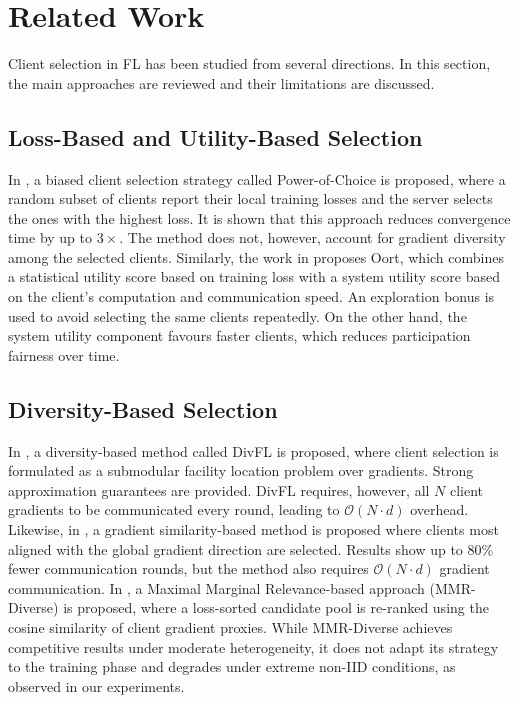 \documentclass[journal]{IEEEtran}
\begin{document}
\section{Related Work}

Client selection in FL has been studied from several directions. In this section, the main approaches are reviewed and their limitations are discussed.

\subsection{Loss-Based and Utility-Based Selection}

In \cite{cho2022towards}, a biased client selection strategy called Power-of-Choice is proposed, where a random subset of clients report their local training losses and the server selects the ones with the highest loss. It is shown that this approach reduces convergence time by up to $3\times$. The method does not, however, account for gradient diversity among the selected clients. Similarly, the work in \cite{lai2021oort} proposes Oort, which combines a statistical utility score based on training loss with a system utility score based on the client's computation and communication speed. An exploration bonus is used to avoid selecting the same clients repeatedly. On the other hand, the system utility component favours faster clients, which reduces participation fairness over time.

\subsection{Diversity-Based Selection}

In \cite{balakrishnan2022diverse}, a diversity-based method called DivFL is proposed, where client selection is formulated as a submodular facility location problem over gradients. Strong approximation guarantees are provided. DivFL requires, however, all $N$ client gradients to be communicated every round, leading to $\mathcal{O}(N \cdot d)$ overhead. Likewise, in \cite{hu2025fedgscs}, a gradient similarity-based method is proposed where clients most aligned with the global gradient direction are selected. Results show up to 80\% fewer communication rounds, but the method also requires $\mathcal{O}(N \cdot d)$ gradient communication. In \cite{carbonara2024mmr}, a Maximal Marginal Relevance-based approach (MMR-Diverse) is proposed, where a loss-sorted candidate pool is re-ranked using the cosine similarity of client gradient proxies. While MMR-Diverse achieves competitive results under moderate heterogeneity, it does not adapt its strategy to the training phase and degrades under extreme non-IID conditions, as observed in our experiments.
\end{document}
